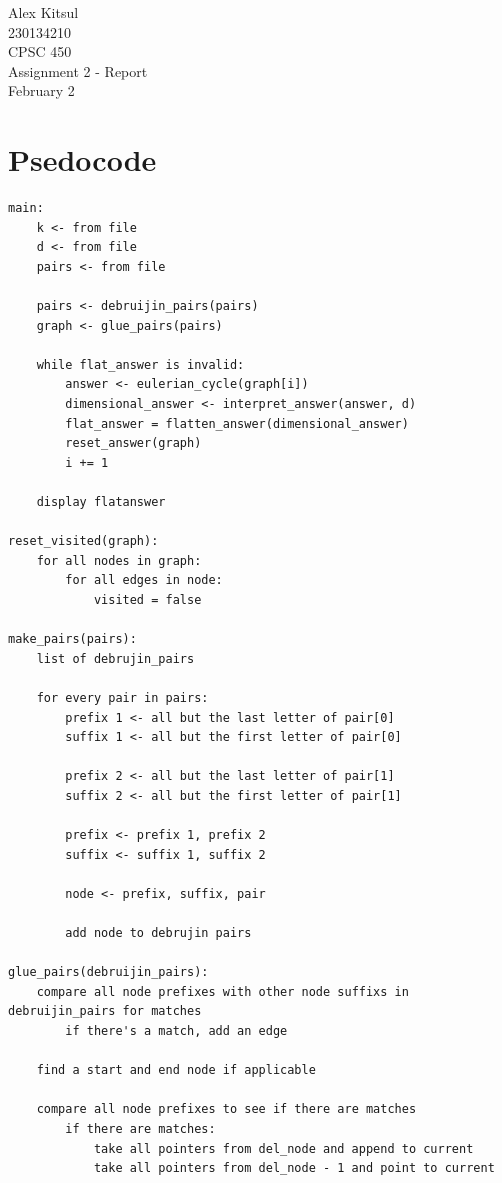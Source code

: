 \documentclass{article}
\begin{document}
\thispagestyle{empty}
\begin{center}
\vspace*{\fill}
\Huge Alex Kitsul\\
\Huge 230134210\\
\Huge CPSC 450\\
\Huge Assignment 2 - Report\\
\Huge February 2\\
\vspace*{\fill}
\end{center}
\pagebreak

\section*{Psedocode}
\begin{lstlisting}
main:
	k <- from file
	d <- from file
	pairs <- from file
	
	pairs <- debruijin_pairs(pairs)
	graph <- glue_pairs(pairs)
	
	while flat_answer is invalid:
		answer <- eulerian_cycle(graph[i])
		dimensional_answer <- interpret_answer(answer, d)
		flat_answer = flatten_answer(dimensional_answer)
		reset_answer(graph)
		i += 1
		
	display flatanswer
	
reset_visited(graph):
	for all nodes in graph:
		for all edges in node:
			visited = false
			
make_pairs(pairs):
	list of debrujin_pairs

	for every pair in pairs:
		prefix 1 <- all but the last letter of pair[0]
		suffix 1 <- all but the first letter of pair[0]
		
		prefix 2 <- all but the last letter of pair[1]
		suffix 2 <- all but the first letter of pair[1]
		
		prefix <- prefix 1, prefix 2
		suffix <- suffix 1, suffix 2
		
		node <- prefix, suffix, pair
		
		add node to debrujin pairs
		
glue_pairs(debruijin_pairs):
	compare all node prefixes with other node suffixs in debruijin_pairs for matches
		if there's a match, add an edge
		
	find a start and end node if applicable
	
	compare all node prefixes to see if there are matches
		if there are matches:
			take all pointers from del_node and append to current
			take all pointers from del_node - 1 and point to current
			

\end{lstlisting}
\end{document}
